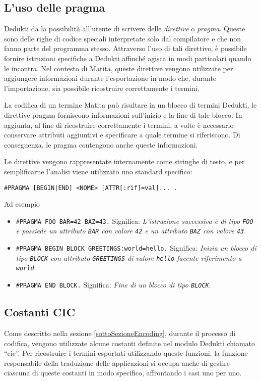 \documentclass[12pt,a4paper]{mimosis}
\begin{document}
\subsection{L'uso delle pragma}
Dedukti da la possibilità all'utente di scrivere delle \textit{direttive} o \textit{pragma}.
Queste sono delle righe di codice speciali interpretate solo dal compilatore 
e che non fanno parte del programma stesso. Attraverso l'uso di tali direttive,
è possibile fornire istruzioni specifiche a Dedukti affinché agisca in modi
particolari quando le incontra. Nel contesto di Matita, queste direttive vengono
utilizzate per aggiungere informazioni durante l'esportazione in modo che,
durante l'importazione, sia possibile ricostruire correttamente i termini.

La codifica di un termine Matita può risultare in un blocco di termini Dedukti,
le direttive pragma forniscono informazioni sull'inizio e la fine di tale blocco.
In aggiunta, al fine di ricostruire correttamente i termini, a volte è necessario
conservare attributi aggiuntivi e specificare a quale termine si riferiscono.
Di conseguenza, le pragma contengono anche queste informazioni.

Le direttive vengono rappresentate internamente come stringhe di testo, e per
semplificarne l'analisi viene utilizzato uno standard specifico:
\begin{center}
  \texttt{\#PRAGMA [BEGIN|END] <NOME> [ATTR[:rif]=val]... .}
\end{center}

Ad esempio
\begin{itemize}
  \item  \texttt{\#PRAGMA FOO BAR=42 BAZ=43.} Significa: \textit{L'istruzione successiva è di tipo
    \texttt{FOO} e possiede un attributo \texttt{BAR} con valore \texttt{42} e 
    un attributo \texttt{BAZ} con valore \texttt{43}}.

  \item  \texttt{\#PRAGMA BEGIN BLOCK GREETINGS:world=hello.} Significa: \textit{
    Inizia un blocco di tipo \texttt{BLOCK} con attributo \texttt{GREETINGS} di 
    valore \texttt{hello} facente riferimento a \texttt{world}}.

  \item  \texttt{\#PRAGMA END BLOCK.} Significa: \textit{Fine di un blocco di tipo
    \texttt{BLOCK}}.
\end{itemize}

\subsection{Costanti CIC}
Come descritto nella sezione \ref{sottoSezioneEncoding}, durante il processo di
codifica, vengono utilizzate alcune costanti definite nel modulo Dedukti chiamato
``cic''. Per ricostruire i termini esportati utilizzando queste funzioni, la funzione
responsabile della traduzione delle applicazioni si occupa anche di gestire ciascuna
di queste costanti in modo specifico, affrontando i casi uno per uno. 
\end{document}
